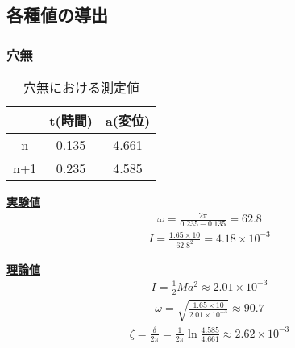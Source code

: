 \documentclass{jsarticle}
\begin{document}
  \subsection{各種値の導出}
  \subsubsection{穴無}
  \begin{table}[H]
   \begin{center}
    \begin{tabular}{|c||c|c|} \hline
        &t(時間) &a(変位) \\ \hline \hline
     n  &0.135   &4.661   \\ \hline
     n+1&0.235   &4.585   \\ \hline
    \end{tabular}
   \end{center}
   \caption{穴無における測定値}
   \label{tbl:ltx-tbl2}
  \end{table}
  \underline{\textbf{実験値}}\\
  \begin{eqnarray}
   \omega=\frac{2\pi}{0.235-0.135}=62.8
  \end{eqnarray}
  \begin{eqnarray}
   I=\frac{1.65\times10}{62.8^2}=4.18\times10^{-3}
  \end{eqnarray}

  \underline{\textbf{理論値}}\\  
  \begin{eqnarray}
   I=\frac{1}{2}Ma^2\approx2.01\times10^{-3}
  \end{eqnarray}
  \begin{eqnarray}
   \omega=\sqrt{\frac{1.65\times10}{2.01\times10^{-3}}}\approx90.7
  \end{eqnarray}
  \begin{eqnarray}
   \zeta=\frac{\delta}{2\pi}=\frac{1}{2\pi}\ln{\frac{4.585}{4.661}}\approx2.62\times10^{-3}
  \end{eqnarray}
\end{document}
